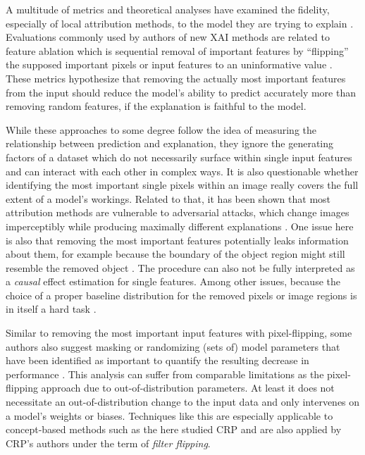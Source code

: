 A multitude of metrics and theoretical analyses have examined the fidelity, especially of local attribution methods, to the model they are trying to explain \citep{Nauta2023}. Evaluations commonly used by authors of new XAI methods are related to feature ablation which is sequential removal of important features by ``flipping'' the supposed important pixels or input features to an uninformative value \citep{Samek2017a}. 
These metrics hypothesize that removing the actually most important features from the input should reduce the model's ability to predict accurately more than removing random features, if the explanation is faithful to the model.

While these approaches to some degree follow the idea of measuring the relationship between prediction and explanation, they ignore the generating factors of a dataset which do not necessarily surface within single input features and can interact with each other in complex ways. It is also questionable whether identifying the most important single pixels within an image really covers the full extent of a model's workings. Related to that, it has been shown that most attribution methods are vulnerable to adversarial attacks, which change images imperceptibly while producing maximally different explanations \citep{Ghorbani2019a, Anders2020, Dombrowski2022,Dombrowski2019}. One issue here is also that removing the most important features potentially leaks information about them, for example because the boundary of the object region might still resemble the removed object \citep{Rong2022}.
The procedure can also not be fully interpreted as a \textit{causal} effect estimation for single features. Among other issues, because the choice of a proper baseline distribution for the removed pixels or image regions is in itself a hard task \citep{Chang2019,Hooker2019, Popescu2021, Rong2022}. 

Similar to removing the most important input features with pixel-flipping, some authors also suggest masking or randomizing (sets of) model parameters that have been identified as important to quantify the resulting decrease in performance \citep{Ghorbani2019,Zhang2021,Achtibat2022, Fel2023}. 
This analysis can suffer from comparable limitations as the pixel-flipping approach due to out-of-distribution parameters. At least it does not necessitate an out-of-distribution change to the input data and only intervenes on a model's weights or biases.
Techniques like this are especially applicable to concept-based methods such as the here studied CRP and are also applied by CRP's authors under the term of \textit{filter flipping}. 

